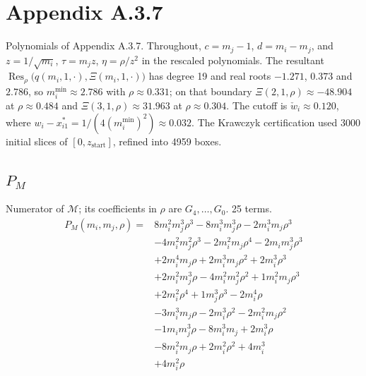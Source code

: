 \section*{Appendix A.3.7}
Polynomials of Appendix A.3.7. Throughout, $c=m_j-1$, $d=m_i-m_j$, and $z=1/\sqrt{m_i}$, $\tau=m_jz$, $\eta=\rho/z^2$ in the rescaled polynomials. The resultant $\operatorname{Res}_\rho\bigl(q(m_i,1,\cdot),\Xi(m_i,1,\cdot)\bigr)$ has degree 19 and real roots $-1.271$, $0.373$ and $2.786$, so $m_i^{\min}\approx2.786$ with $\rho\approx0.331$; on that boundary $\Xi(2,1,\rho)\approx-48.904$ at $\rho\approx0.484$ and $\Xi(3,1,\rho)\approx31.963$ at $\rho\approx0.304$. The cutoff is $\check w_i\approx0.120$, where $w_i-x_{i1}^*=1/(4(m_i^{\min})^2)\approx0.032$. The Krawczyk certification used 3000 initial slices of $[0,z_{\mathrm{start}}]$, refined into 4959 boxes.

\subsection*{$P_M$}
Numerator of $\mathcal M$; its coefficients in $\rho$ are $G_4,\dots,G_0$. 25 terms.
{\small
\begin{align*}
P_M(m_i,m_j,\rho)={}&8m_i^{2}m_j^{3}\rho^{3}-8m_i^{3}m_j^{3}\rho-2m_i^{3}m_j\rho^{3}\\
&-4m_i^{2}m_j^{2}\rho^{3}-2m_i^{2}m_j\rho^{4}-2m_im_j^{3}\rho^{3}\\
&+2m_i^{4}m_j\rho+2m_i^{3}m_j\rho^{2}+2m_i^{3}\rho^{3}\\
&+2m_i^{2}m_j^{3}\rho-4m_i^{2}m_j^{2}\rho^{2}+1m_i^{2}m_j\rho^{3}\\
&+2m_i^{2}\rho^{4}+1m_j^{3}\rho^{3}-2m_i^{4}\rho\\
&-3m_i^{3}m_j\rho-2m_i^{3}\rho^{2}-2m_i^{2}m_j\rho^{2}\\
&-1m_im_j^{3}\rho-8m_i^{3}m_j+2m_i^{3}\rho\\
&-8m_i^{2}m_j\rho+2m_i^{2}\rho^{2}+4m_i^{3}\\
&+4m_i^{2}\rho
\end{align*}
}

